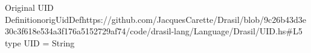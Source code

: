 \begin{haskell}{Original UID Definition}{origUidDef}{https://github.com/JacquesCarette/Drasil/blob/9c26b43d3e30c3f618e534a3f176a5152729af74/code/drasil-lang/Language/Drasil/UID.hs\#L5}
type UID = String
\end{haskell}
